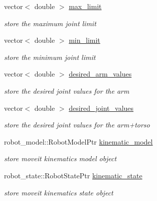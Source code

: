 \begin{DoxyCompactItemize}
\item 
\mbox{\label{classMOVEIT__IK_a96a7cdcec1cc5495fbefd8f7d0fb2abd}} 
vector$<$ double $>$ \hyperlink{classMOVEIT__IK_a96a7cdcec1cc5495fbefd8f7d0fb2abd}{max\+\_\+limit}
\begin{DoxyCompactList}\small\item\em store the maximum joint limit \end{DoxyCompactList}\item 
\mbox{\label{classMOVEIT__IK_acf4cefec4cf6a6a9f2c686e72ac5ca88}} 
vector$<$ double $>$ \hyperlink{classMOVEIT__IK_acf4cefec4cf6a6a9f2c686e72ac5ca88}{min\+\_\+limit}
\begin{DoxyCompactList}\small\item\em store the minimum joint limit \end{DoxyCompactList}\item 
\mbox{\label{classMOVEIT__IK_a9a56827e336f026573086de4924f1b79}} 
vector$<$ double $>$ \hyperlink{classMOVEIT__IK_a9a56827e336f026573086de4924f1b79}{desired\+\_\+arm\+\_\+values}
\begin{DoxyCompactList}\small\item\em store the desired joint values for the arm \end{DoxyCompactList}\item 
\mbox{\label{classMOVEIT__IK_a4dd561e5e04d724bd7bbe5bd68f1941c}} 
vector$<$ double $>$ \hyperlink{classMOVEIT__IK_a4dd561e5e04d724bd7bbe5bd68f1941c}{desired\+\_\+joint\+\_\+values}
\begin{DoxyCompactList}\small\item\em store the desired joint values for the arm+torso \end{DoxyCompactList}\item 
\mbox{\label{classMOVEIT__IK_a142336a7c121f66031ebfc760cb16f00}} 
robot\+\_\+model\+::\+Robot\+Model\+Ptr \hyperlink{classMOVEIT__IK_a142336a7c121f66031ebfc760cb16f00}{kinematic\+\_\+model}
\begin{DoxyCompactList}\small\item\em store moveit kinematics model object \end{DoxyCompactList}\item 
\mbox{\label{classMOVEIT__IK_a30a052ada12389671b0042507d8eb9b7}} 
robot\+\_\+state\+::\+Robot\+State\+Ptr \hyperlink{classMOVEIT__IK_a30a052ada12389671b0042507d8eb9b7}{kinematic\+\_\+state}
\begin{DoxyCompactList}\small\item\em store moveit kinematics state object \end{DoxyCompactList}\end{DoxyCompactItemize}
